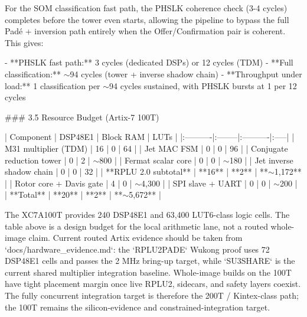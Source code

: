For the SOM classification fast path, the PHSLK coherence check (3-4 cycles)
completes before the tower even starts, allowing the pipeline to bypass the
full Padé + inversion path entirely when the Offer/Confirmation pair is coherent.
This gives:

- **PHSLK fast path:** 3 cycles (dedicated DSPs) or 12 cycles (TDM)
- **Full classification:** $\sim$94 cycles (tower + inverse shadow chain)
- **Throughput under load:** 1 classification per $\sim$94 cycles sustained,
  with PHSLK bursts at 1 per 12 cycles

### 3.5 Resource Budget (Artix-7 100T)

| Component | DSP48E1 | Block RAM | LUTs |
|:----------|:--------|:----------|:-----|
| M31 multiplier (TDM) | 16 | 0 | 64 |
| Jet MAC FSM | 0 | 0 | 96 |
| Conjugate reduction tower | 0 | 2 | $\sim$800 |
| Fermat scalar core | 0 | 0 | $\sim$180 |
| Jet inverse shadow chain | 0 | 0 | 32 |
| **RPLU 2.0 subtotal** | **16** | **2** | **$\sim$1,172** |
| Rotor core + Davis gate | 4 | 0 | $\sim$4,300 |
| SPI slave + UART | 0 | 0 | $\sim$200 |
| **Total** | **20** | **2** | **$\sim$5,672** |

The XC7A100T provides 240 DSP48E1 and 63,400 LUT6-class logic cells. The table
above is a design budget for the local arithmetic lane, not a routed whole-image
claim. Current routed Artix evidence should be taken from
`docs/hardware_evidence.md`: the `RPLU2PADE` Wukong proof uses 72 DSP48E1 cells
and passes the 2 MHz bring-up target, while `SU3SHARE` is the current shared
multiplier integration baseline. Whole-image builds on the 100T have tight
placement margin once live RPLU2, sidecars, and safety layers coexist. The fully
concurrent integration target is therefore the 200T / Kintex-class path; the
100T remains the silicon-evidence and constrained-integration target.
